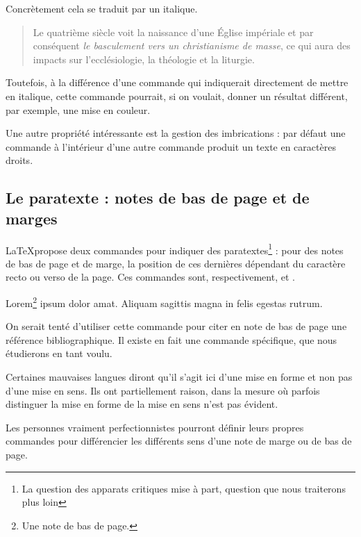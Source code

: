 Concrètement cela se traduit par un italique. 

\begin{quotation}
Le quatrième siècle voit la naissance d'une Église impériale et par conséquent \emph{le basculement vers un christianisme de masse}, ce qui aura des impacts sur l'ecclésiologie, la théologie et la liturgie.
\end{quotation}

Toutefois, à la différence d'une commande qui indiquerait directement de mettre en italique, cette commande pourrait, si on voulait, donner un résultat différent, par exemple, une mise en couleur. 

Une autre propriété intéressante est la gestion des imbrications : par défaut une commande  à l'intérieur d'une autre commande  produit un texte en caractères droits.

\subsection{Le paratexte : notes de bas de page et de marges}

\LaTeX propose deux commandes pour indiquer des paratextes\footnote{La question des apparats critiques mise à part, question que nous traiterons plus loin} : pour des notes de bas de page et de marge, la position de ces dernières dépendant du caractère recto ou verso de la page. Ces commandes sont, respectivement,  et .

\begin{latexcode}
Lorem\footnote{Une note de bas de page.} ipsum dolor amat.
Aliquam sagittis magna in felis egestas rutrum.
\end{latexcode}

\begin{attention}
	On serait tenté d'utiliser cette commande pour citer en note de bas de page une référence bibliographique. Il existe en fait une commande spécifique, que nous étudierons en tant voulu.
\end{attention}
\begin{attention}
	Certaines mauvaises langues diront qu'il s'agit ici d'une mise en forme et non pas d'une mise en sens. Ils ont partiellement raison, dans la mesure où parfois distinguer la mise en forme de la mise en sens n'est pas évident.
	
	Les personnes vraiment perfectionnistes pourront définir leurs propres commandes pour différencier les différents sens d'une note de marge ou de bas de page.
\end{attention}

